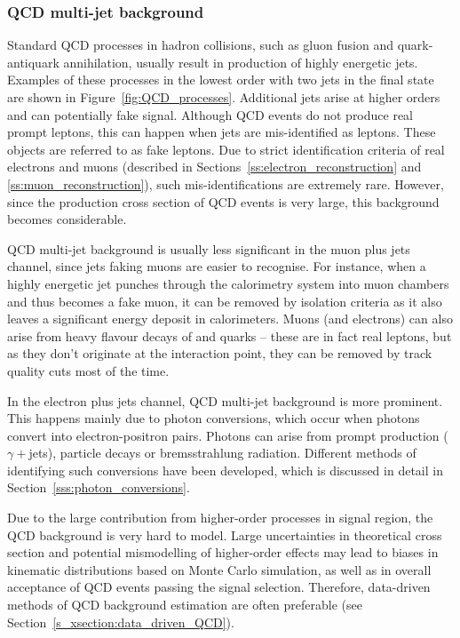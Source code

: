 \subsubsection*{QCD multi-jet background}
Standard QCD processes in hadron collisions, such as gluon fusion and quark-antiquark annihilation, usually result in
production of highly energetic jets. Examples of these processes in the lowest order with two jets in the final state
are shown in Figure~\ref{fig:QCD_processes}. Additional jets arise at higher orders and can potentially fake \ttbar
signal. Although QCD events do not produce real prompt leptons, this can happen when jets are mis-identified as leptons.
These objects are referred to as fake leptons. Due to strict identification criteria of real electrons and muons
(described in Sections~\ref{ss:electron_reconstruction} and \ref{ss:muon_reconstruction}), such mis-identifications are
extremely rare. However, since the production cross section of QCD events is very large, this background becomes
considerable.



QCD multi-jet background is usually less significant in the muon plus jets channel, since jets faking muons are easier
to recognise. For instance, when a highly energetic jet punches through the calorimetry system into muon chambers and
thus becomes a fake muon, it can be removed by isolation criteria as it also leaves a significant energy deposit in
calorimeters. Muons (and electrons) can also arise from heavy flavour decays of \cPqb and \cPqc quarks -- these are in
fact real leptons, but as they don't originate at the interaction point, they can be removed by track quality cuts most
of the time.

In the electron plus jets channel, QCD multi-jet background is more prominent. This happens mainly due to photon
conversions, which occur when photons convert into electron-positron pairs. Photons can arise from prompt production
($\gamma+$jets), particle decays or bremsstrahlung radiation. Different methods of identifying such conversions have
been developed, which is discussed in detail in Section~\ref{sss:photon_conversions}.

Due to the large contribution from higher-order processes in signal region, the QCD background is very hard to model.
Large uncertainties in theoretical cross section and potential mismodelling of higher-order effects may lead to biases
in kinematic distributions based on Monte Carlo simulation, as well as in overall acceptance of QCD events passing the
signal selection. Therefore, data-driven methods of QCD background estimation are often preferable (see
Section~\ref{s_xsection:data_driven_QCD}).

